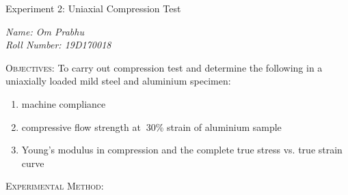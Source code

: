 \documentclass[a4paper, 11pt]{article}
\begin{document}
\begin{center}
	{\Large \sc Experiment 2: Uniaxial Compression Test}
\end{center}
\textit{Name: Om Prabhu\\
Roll Number: 19D170018}
\vspace{-1.5mm}

\hrulefill
\vspace{2mm}

\textsc{Objectives:} To carry out compression test and determine the following in a uniaxially loaded mild steel and aluminium specimen:
\vspace{-2mm}

\begin{enumerate}[label=(\alph*)]
	\itemsep-0.2em
	\item machine compliance
	\item compressive flow strength at $~$30\% strain of aluminium sample
	\item Young's modulus in compression and the complete true stress vs. true strain curve
\end{enumerate}

\textsc{Experimental Method:}
\vspace{-2mm}
\end{document}
